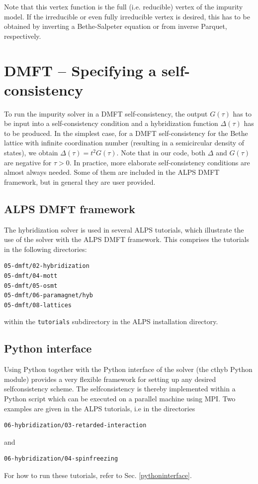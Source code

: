 \documentclass[aps,prb,floatfix,superscriptaddress,twocolumn,notitlepage]{revtex4-1}
\begin{document}
Note that this vertex function is the full (i.e. reducible) vertex of the impurity model. If the irreducible or even fully irreducible vertex is desired, this has to be obtained by inverting a Bethe-Salpeter equation or from inverse Parquet, respectively.

\section{DMFT -- Specifying a self-consistency}
To run the impurity solver in a DMFT self-consistency, the output $G(\tau)$ has to be input into a self-consistency condition and a hybridization function $\Delta(\tau)$ has to be produced.\cite{Georges96,Kotliar06} In the simplest case, for a DMFT self-consistency for the Bethe lattice with infinite coordination number (resulting in a semicircular density of states), we obtain $\Delta(\tau)=t^2G(\tau)$.
Note that in our code, both $\Delta$ and $G(\tau)$ are negative for $\tau>0$.
In practice, more elaborate self-consistency conditions are almost always needed. 
Some of them are included in the ALPS DMFT framework, but in general they are user provided.

\subsection{ALPS DMFT framework}

The hybridization solver is used in several ALPS tutorials, which illustrate the use of the solver with the ALPS DMFT framework. This comprises the tutorials in the following directories:
\begin{verbatim}
05-dmft/02-hybridization
05-dmft/04-mott
05-dmft/05-osmt
05-dmft/06-paramagnet/hyb
05-dmft/08-lattices
\end{verbatim}
within the \verb#tutorials# subdirectory in the ALPS installation directory.

\subsection{Python interface}

Using Python together with the Python interface of the solver (the cthyb Python module) provides a very flexible framework for setting up any desired selfconsistency scheme.
The selfconsistency is thereby implemented within a Python script which can be executed on a parallel machine using MPI.
Two examples are given in the ALPS tutorials, i.e in the directories
\begin{verbatim}
06-hybridization/03-retarded-interaction
\end{verbatim}
and
\begin{verbatim}
06-hybridization/04-spinfreezing
\end{verbatim}
For how to run these tutorials, refer to Sec. \ref{pythoninterface}.
\end{document}
